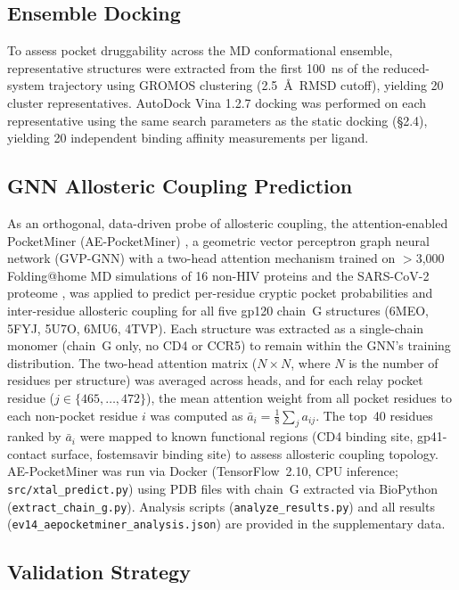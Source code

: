 \documentclass[11pt,a4paper]{article}
\begin{document}
\subsection{Ensemble Docking}

To assess pocket druggability across the MD conformational ensemble, representative structures were extracted from the first 100~ns of the reduced-system trajectory using GROMOS clustering (2.5~\AA\ RMSD cutoff), yielding 20 cluster representatives. AutoDock Vina 1.2.7 docking was performed on each representative using the same search parameters as the static docking (\S2.4), yielding 20 independent binding affinity measurements per ligand.

\subsection{GNN Allosteric Coupling Prediction}

As an orthogonal, data-driven probe of allosteric coupling, the attention-enabled PocketMiner (AE-PocketMiner) \citep{Zhang2026AEPocketMiner}, a geometric vector perceptron graph neural network (GVP-GNN) with a two-head attention mechanism trained on $>$3{,}000 Folding@home MD simulations of 16 non-HIV proteins and the SARS-CoV-2 proteome \citep{Meller2023}, was applied to predict per-residue cryptic pocket probabilities and inter-residue allosteric coupling for all five gp120 chain~G structures (6MEO, 5FYJ, 5U7O, 6MU6, 4TVP). Each structure was extracted as a single-chain monomer (chain~G only, no CD4 or CCR5) to remain within the GNN's training distribution. The two-head attention matrix ($N \times N$, where $N$ is the number of residues per structure) was averaged across heads, and for each relay pocket residue ($j \in \{465, \ldots, 472\}$), the mean attention weight from all pocket residues to each non-pocket residue $i$ was computed as $\bar{a}_i = \frac{1}{8}\sum_{j} a_{ij}$. The top~40 residues ranked by $\bar{a}_i$ were mapped to known functional regions (CD4 binding site, gp41-contact surface, fostemsavir binding site) to assess allosteric coupling topology. AE-PocketMiner was run via Docker (TensorFlow~2.10, CPU inference; \texttt{src/xtal\_predict.py}) using PDB files with chain~G extracted via BioPython (\texttt{extract\_chain\_g.py}). Analysis scripts (\texttt{analyze\_results.py}) and all results (\texttt{ev14\_aepocketminer\_analysis.json}) are provided in the supplementary data.

\subsection{Validation Strategy}
\end{document}
